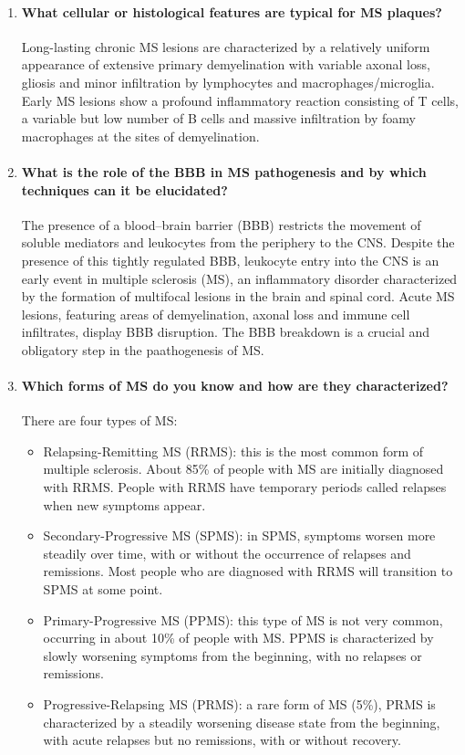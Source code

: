 \documentclass[12pt,article,oneside,a4paper]{memoir}
\begin{document}
\begin{enumerate}
\item \paragraph{What cellular or histological features are typical for MS
plaques?}

Long-lasting chronic MS lesions are characterized by a relatively uniform
appearance of extensive primary demyelination with variable axonal loss,
gliosis and minor infiltration by lymphocytes and macrophages/microglia. Early
MS lesions show a profound inflammatory reaction consisting of T cells, a
variable but low number of B cells and massive infiltration by foamy
macrophages at the sites of demyelination.


\item \paragraph{What is the role of the BBB in MS pathogenesis and by which
techniques can it be elucidated?}

The presence of a blood–brain barrier (BBB) restricts the movement of soluble
mediators and leukocytes from the periphery to the CNS. Despite the presence of
this tightly regulated BBB, leukocyte entry into the CNS is an early event in
multiple sclerosis (MS), an inflammatory disorder characterized by the
formation of multifocal lesions in the brain and spinal cord. Acute MS lesions,
featuring areas of demyelination, axonal loss and immune cell infiltrates,
display BBB disruption. The BBB breakdown is a crucial and obligatory step in 
the paathogenesis of MS.

\item \paragraph{Which forms of MS do you know and how are they characterized?}
There are four types of MS:
\begin{itemize}
\item Relapsing-Remitting MS (RRMS): this is the most common form of multiple
sclerosis. About 85\% of people with MS are initially diagnosed with RRMS.
People with RRMS have temporary periods called relapses when new symptoms
appear.
\item Secondary-Progressive MS (SPMS): in SPMS, symptoms worsen more steadily
over time, with or without the occurrence of relapses and remissions. Most
people who are diagnosed with RRMS will transition to SPMS at some point.
\item Primary-Progressive MS (PPMS): this type of MS is not very common,
occurring in about 10\% of people with MS. PPMS is characterized by slowly
worsening symptoms from the beginning, with no relapses or remissions.
\item Progressive-Relapsing MS (PRMS): a rare form of MS (5\%), PRMS is
characterized by a steadily worsening disease state from the beginning, with
acute relapses but no remissions, with or without recovery.
\end{itemize}

\end{enumerate}
\end{document}
